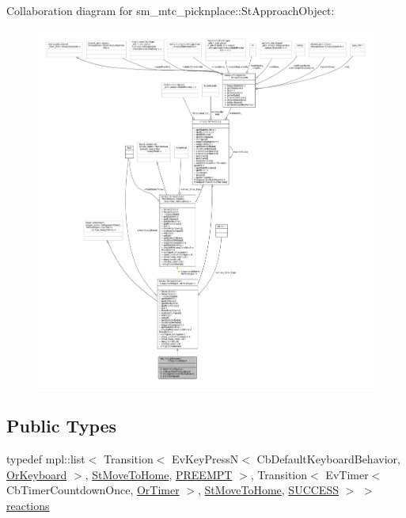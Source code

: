 Collaboration diagram for sm\+\_\+mtc\+\_\+picknplace\+:\+:St\+Approach\+Object\+:
\nopagebreak
\begin{figure}[H]
\begin{center}
\leavevmode
\includegraphics[width=350pt]{structsm__mtc__picknplace_1_1StApproachObject__coll__graph}
\end{center}
\end{figure}
\subsection*{Public Types}
\begin{DoxyCompactItemize}
\item 
typedef mpl\+::list$<$ Transition$<$ Ev\+Key\+PressN$<$ Cb\+Default\+Keyboard\+Behavior, \hyperlink{classsm__mtc__picknplace_1_1OrKeyboard}{Or\+Keyboard} $>$, \hyperlink{structsm__mtc__picknplace_1_1StMoveToHome}{St\+Move\+To\+Home}, \hyperlink{classPREEMPT}{P\+R\+E\+E\+M\+PT} $>$, Transition$<$ Ev\+Timer$<$ Cb\+Timer\+Countdown\+Once, \hyperlink{classsm__mtc__picknplace_1_1OrTimer}{Or\+Timer} $>$, \hyperlink{structsm__mtc__picknplace_1_1StMoveToHome}{St\+Move\+To\+Home}, \hyperlink{classSUCCESS}{S\+U\+C\+C\+E\+SS} $>$ $>$ \hyperlink{structsm__mtc__picknplace_1_1StApproachObject_aae05e89333731410b01b87157f8387f4}{reactions}
\end{DoxyCompactItemize}
